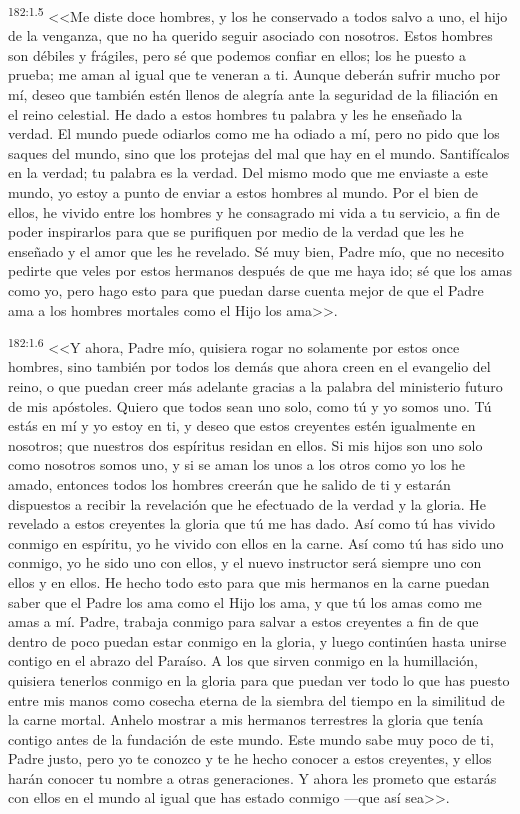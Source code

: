 \par 
\textsuperscript{182:1.5} <<Me diste doce hombres, y los he conservado a todos salvo a uno, el hijo de la venganza, que no ha querido seguir asociado con nosotros. Estos hombres son débiles y frágiles, pero sé que podemos confiar en ellos; los he puesto a prueba; me aman al igual que te veneran a ti. Aunque deberán sufrir mucho por mí, deseo que también estén llenos de alegría ante la seguridad de la filiación en el reino celestial. He dado a estos hombres tu palabra y les he enseñado la verdad. El mundo puede odiarlos como me ha odiado a mí, pero no pido que los saques del mundo, sino que los protejas del mal que hay en el mundo. Santifícalos en la verdad; tu palabra es la verdad. Del mismo modo que me enviaste a este mundo, yo estoy a punto de enviar a estos hombres al mundo. Por el bien de ellos, he vivido entre los hombres y he consagrado mi vida a tu servicio, a fin de poder inspirarlos para que se purifiquen por medio de la verdad que les he enseñado y el amor que les he revelado. Sé muy bien, Padre mío, que no necesito pedirte que veles por estos hermanos después de que me haya ido; sé que los amas como yo, pero hago esto para que puedan darse cuenta mejor de que el Padre ama a los hombres mortales como el Hijo los ama>>.

\par 
\textsuperscript{182:1.6} <<Y ahora, Padre mío, quisiera rogar no solamente por estos once hombres, sino también por todos los demás que ahora creen en el evangelio del reino, o que puedan creer más adelante gracias a la palabra del ministerio futuro de mis apóstoles. Quiero que todos sean uno solo, como tú y yo somos uno. Tú estás en mí y yo estoy en ti, y deseo que estos creyentes estén igualmente en nosotros; que nuestros dos espíritus residan en ellos. Si mis hijos son uno solo como nosotros somos uno, y si se aman los unos a los otros como yo los he amado, entonces todos los hombres creerán que he salido de ti y estarán dispuestos a recibir la revelación que he efectuado de la verdad y la gloria. He revelado a estos creyentes la gloria que tú me has dado. Así como tú has vivido conmigo en espíritu, yo he vivido con ellos en la carne. Así como tú has sido uno conmigo, yo he sido uno con ellos, y el nuevo instructor será siempre uno con ellos y en ellos. He hecho todo esto para que mis hermanos en la carne puedan saber que el Padre los ama como el Hijo los ama, y que tú los amas como me amas a mí. Padre, trabaja conmigo para salvar a estos creyentes a fin de que dentro de poco puedan estar conmigo en la gloria, y luego continúen hasta unirse contigo en el abrazo del Paraíso. A los que sirven conmigo en la humillación, quisiera tenerlos conmigo en la gloria para que puedan ver todo lo que has puesto entre mis manos como cosecha eterna de la siembra del tiempo en la similitud de la carne mortal. Anhelo mostrar a mis hermanos terrestres la gloria que tenía contigo antes de la fundación de este mundo. Este mundo sabe muy poco de ti, Padre justo, pero yo te conozco y te he hecho conocer a estos creyentes, y ellos harán conocer tu nombre a otras generaciones. Y ahora les prometo que estarás con ellos en el mundo al igual que has estado conmigo ---que así sea>>.

